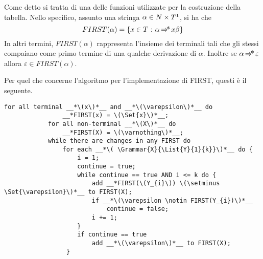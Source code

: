 \documentclass{subfiles}
\begin{document}
Come detto si tratta di una delle funzioni utilizzate per la costruzione della tabella.
Nello specifico, assunto una stringa \(\alpha \in N \times T\footnotemark[1]\), si ha che
\[
    FIRST(\alpha) = \Set{x \in T}[\alpha \Derivation x\beta]
\]
In altri termini, \(FIRST(\alpha)\) rappresenta l'insieme dei terminali tali che gli stessi compaiano come primo termine di una qualche derivazione di \(\alpha\).
Inoltre se \(\alpha \operatorname{\Rightarrow\hspace{-5pt}*} \varepsilon\) allora \(\varepsilon \in FIRST(\alpha)\).

\begin{Algorithm*}
    Per quel che concerne l'algoritmo per l'implementazione di FIRST, questi è il seguente.
    \begin{center}
        \begin{lstlisting}[language = PSEUDO]
            for all terminal __*\(x\)*__ and __*\(\varepsilon\)*__ do
                __*FIRST(x) = \(\Set{x}\)*__;
            for all non-terminal __*\(X\)*__ do
                __*FIRST(X) = \(\varnothing\)*__;
            while there are changes in any FIRST do
                for each __*\( \Grammar{X}{\List{Y}{1}{k}}\)*__ do {
                    i = 1;
                    continue = true;
                    while continue == true AND i <= k do {
                        add __*FIRST(\(Y_{i}\)) \(\setminus \Set{\varepsilon}\)*__ to FIRST(X);
                        if __*\(\varepsilon \notin FIRST(Y_{i})\)*__
                            continue = false;
                        i += 1;
                    }
                    if continue == true
                        add __*\(\varepsilon\)*__ to FIRST(X);
                 }
        \end{lstlisting}
    \end{center}
\end{Algorithm*}
\end{document}
